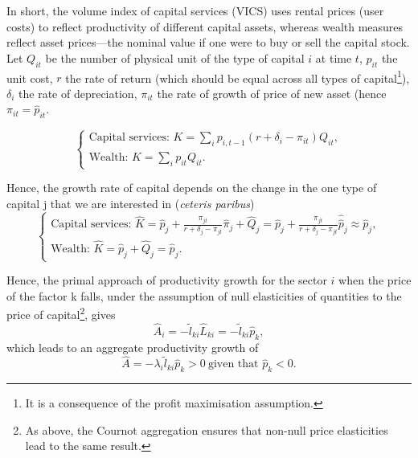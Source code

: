 \documentclass[11pt]{article}
\begin{document}
In short, the volume index of capital services (VICS) uses rental prices (user costs) to reflect productivity of different capital assets, whereas wealth measures reflect asset prices—the nominal value if one were to buy or sell the capital stock. Let $Q_{it}$ be the number of physical unit of the type of capital $i$ at time $t$, $p_{it}$ the unit cost, $r$ the rate of return (which should be equal across all types of capital\footnote{It is a consequence of the profit maximisation assumption.}), $\delta_i$ the rate of depreciation, $\pi_{it}$ the rate of growth of price of new asset (hence $\pi_{it}=\hat{p}_{it}$. 

\begin{equation}
    \begin{cases}
        \text{Capital services: } K= \sum_{i} p_{i,t-1}(r+\delta_i -\pi_{it})Q_{it},\\
        \text{Wealth: } K= \sum_{i} p_{it}Q_{it}.
    \end{cases}
\end{equation}

Hence, the growth rate of capital depends on the change in the one type of capital j that we are interested in (\textit{ceteris paribus})
\begin{equation}
    \begin{cases}
        \text{Capital services: } \hat{K}=  \hat{p}_{j} +\frac{\pi_{jt}}{r+\delta_j -\pi_{jt}}\hat{\pi}_j +\hat{Q}_{j}=\hat{p}_{j} +\frac{\pi_{jt}}{r+\delta_j -\pi_{jt}}\hat{\hat{p}}_j\approx\hat{p}_{j}  ,\\
        \text{Wealth: } \hat{K}= \hat{p}_{j}+\hat{Q}_{j}=\hat{p}_{j}.
    \end{cases}
\end{equation}

Hence, the primal approach of productivity growth for the sector $i$ when the price of the factor k falls, under the assumption of null elasticities of quantities to the price of capital\footnote{As above, the Cournot aggregation ensures that non-null price elasticities lead to the same result.}, gives 
\begin{equation}
    \hat{A}_i=-\tilde{l}_{ki}\hat{L}_{ki}=-\tilde{l}_{ki}\hat{p}_{k},
\end{equation}
which leads to an aggregate productivity growth of 
\begin{equation}
    \hat{A}=-\lambda_i\tilde{l}_{ki}\hat{p}_{k}>0~\text{given that }\hat{p}_k<0.
\end{equation}
\end{document}
